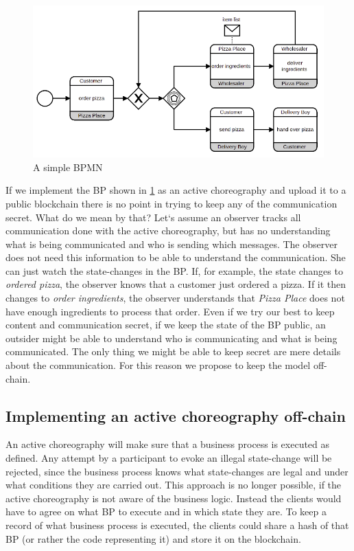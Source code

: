 \documentclass[runningheads]{llncs}
\begin{document}
\begin{figure}
    \centering
    \includegraphics[scale=0.6]{bpmn.png}
    \caption{A simple BPMN}
    \label{fig:BPmn}
\end{figure}

If we implement the BP shown in \ref{fig:BPmn} as an active choreography and upload it to a public blockchain there is no point in trying to keep any of the communication secret. What do we mean by that? Let`s assume an observer tracks all communication done with the active choreography, but has no understanding what is being communicated and who is sending which messages. The observer does not need this information to be able to understand the communication. She can just watch the state-changes in the BP. If, for example, the state changes to \textit{ordered pizza}, the observer knows that a customer just ordered a pizza. If it then changes to \textit{order ingredients}, the observer understands that \textit{Pizza Place} does not have enough ingredients to process that order. Even if we try our best to keep content and communication secret, if we keep the state of the BP public, an outsider might be able to understand who is communicating and what is being communicated. The only thing we might be able to keep secret are mere details about the communication. For this reason we propose to keep the model off-chain. 


\subsection{Implementing an active choreography off-chain}

An active choreography will make sure that a business process is executed as defined. Any attempt by a participant to evoke an illegal state-change will be rejected, since the business process knows what state-changes are legal and under what conditions they are carried out. This approach is no longer possible, if the active choreography is not aware of the business logic. Instead the clients would have to agree on what BP to execute and in which state they are. To keep a record of what business process is executed, the clients could share a hash of that BP (or rather the code representing it) and store it on the blockchain. 
\end{document}
